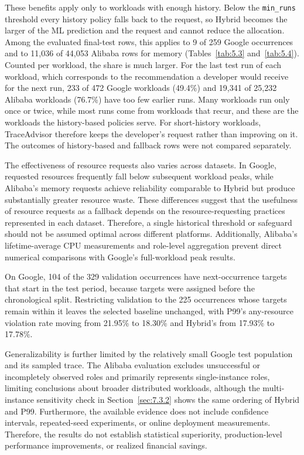 These benefits apply only to workloads with enough history. Below the \texttt{min\_runs} threshold every history policy falls back to the request, so Hybrid becomes the larger of the ML prediction and the request and cannot reduce the allocation. Among the evaluated final-test rows, this applies to 9 of 259 Google occurrences and to 11,036 of 44,053 Alibaba rows for memory (Tables~\ref{tab:5.3} and~\ref{tab:5.4}). Counted per workload, the share is much larger. For the last test run of each workload, which corresponds to the recommendation a developer would receive for the next run, 233 of 472 Google workloads (49.4\%) and 19,341 of 25,232 Alibaba workloads (76.7\%) have too few earlier runs. Many workloads run only once or twice, while most runs come from workloads that recur, and these are the workloads the history-based policies serve. For short-history workloads, TraceAdvisor therefore keeps the developer's request rather than improving on it. The outcomes of history-based and fallback rows were not compared separately.

The effectiveness of resource requests also varies across datasets. In Google, requested resources frequently fall below subsequent workload peaks, while Alibaba's memory requests achieve reliability comparable to Hybrid but produce substantially greater resource waste. These differences suggest that the usefulness of resource requests as a fallback depends on the resource-requesting practices represented in each dataset. Therefore, a single historical threshold or safeguard should not be assumed optimal across different platforms. Additionally, Alibaba's lifetime-average CPU measurements and role-level aggregation prevent direct numerical comparisons with Google's full-workload peak results.

On Google, 104 of the 329 validation occurrences have next-occurrence targets that start in the test period, because targets were assigned before the chronological split. Restricting validation to the 225 occurrences whose targets remain within it leaves the selected baseline unchanged, with P99's any-resource violation rate moving from 21.95\% to 18.30\% and Hybrid's from 17.93\% to 17.78\%.

Generalizability is further limited by the relatively small Google test population and its sampled trace. The Alibaba evaluation excludes unsuccessful or incompletely observed roles and primarily represents single-instance roles, limiting conclusions about broader distributed workloads, although the multi-instance sensitivity check in Section~\ref{sec:7.3.2} shows the same ordering of Hybrid and P99. Furthermore, the available evidence does not include confidence intervals, repeated-seed experiments, or online deployment measurements. Therefore, the results do not establish statistical superiority, production-level performance improvements, or realized financial savings.
